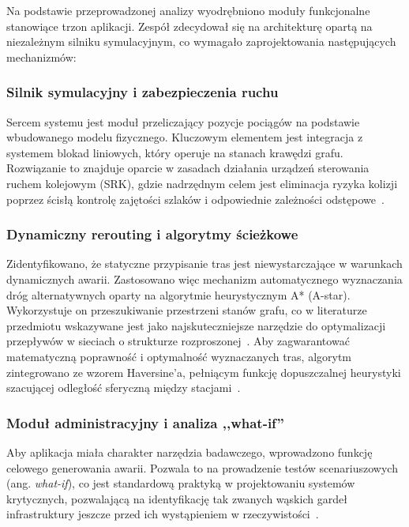 \documentclass[twoside]{projektInzynierskiMS1z}
\begin{document}
Na podstawie przeprowadzonej analizy wyodrębniono moduły funkcjonalne stanowiące trzon
aplikacji. Zespół zdecydował się na architekturę opartą na niezależnym silniku
symulacyjnym, co wymagało zaprojektowania następujących mechanizmów:

\subsubsection{Silnik symulacyjny i zabezpieczenia ruchu}

Sercem systemu jest moduł przeliczający pozycje pociągów na podstawie wbudowanego
modelu fizycznego. Kluczowym elementem jest integracja z systemem blokad liniowych,
który operuje na stanach krawędzi grafu. Rozwiązanie to znajduje oparcie w zasadach
działania urządzeń sterowania ruchem kolejowym (SRK), gdzie nadrzędnym celem jest
eliminacja ryzyka kolizji poprzez ścisłą kontrolę zajętości szlaków i odpowiednie
zależności odstępowe~\cite{srk}.

\subsubsection{Dynamiczny rerouting i algorytmy ścieżkowe}

Zidentyfikowano, że statyczne przypisanie tras jest niewystarczające w warunkach
dynamicznych awarii. Zastosowano więc mechanizm automatycznego wyznaczania dróg
alternatywnych oparty na algorytmie heurystycznym A* (A-star). Wykorzystuje on
przeszukiwanie przestrzeni stanów grafu, co w literaturze przedmiotu wskazywane jest
jako najskuteczniejsze narzędzie do optymalizacji przepływów w sieciach o strukturze
rozproszonej~\cite{astar1968}. Aby zagwarantować matematyczną poprawność i optymalność
wyznaczanych tras, algorytm zintegrowano ze wzorem Haversine'a, pełniącym funkcję
dopuszczalnej heurystyki szacującej odległość sferyczną między
stacjami~\cite{haversine}.

\subsubsection{Moduł administracyjny i analiza ,,what-if''}

Aby aplikacja miała charakter narzędzia badawczego, wprowadzono funkcję celowego
generowania awarii. Pozwala to na prowadzenie testów scenariuszowych (ang.
\emph{what-if}), co jest standardową praktyką w projektowaniu systemów krytycznych,
pozwalającą na identyfikację tak zwanych wąskich gardeł infrastruktury jeszcze przed
ich wystąpieniem w rzeczywistości~\cite{sommerville2016}.
\end{document}

